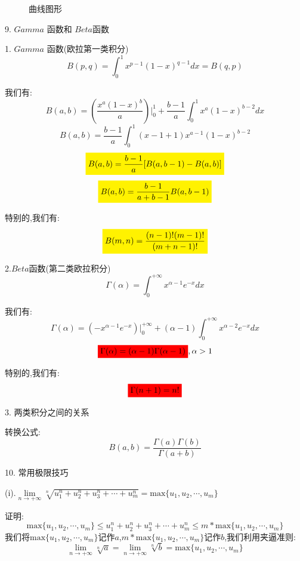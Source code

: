 \begin{figure}[H]
	\caption{曲线图形}
\end{figure}
9. $Gamma$ 函数和 $Beta$函数
\begin{definition}	
	1. $Gamma$ 函数(欧拉第一类积分)
	$$B(p,q)=\int_{0}^{1}x^{p-1}(1-x)^{q-1}dx=B(q,p)$$
	
	我们有:  $$B(a,b)=(\frac{x^a(1-x)^b}{a})|_{0}^{1}+\frac{b-1}{a}\int_{0}^{1}x^{a}(1-x)^{b-2}dx$$
	$$B(a,b)=\frac{b-1}{a}\int_{0}^{1}(x-1+1)x^{a-1}(1-x)^{b-2}$$
	$$\mathcolorbox{yellow}{B(a,b)=\frac{b-1}{a}[B(a,b-1)-B(a,b)]}$$ $$\mathcolorbox{yellow}{B(a,b)=\frac{b-1}{a+b-1}B(a,b-1)}$$
	
	特别的,我们有:  $$\mathcolorbox{yellow}{B(m,n)=\frac{(n-1)!(m-1)!}{(m+n-1)!}}$$
	
	2.$Beta$函数(第二类欧拉积分)
	$$\Gamma(\alpha)=\int_{0}^{+\infty}x^{\alpha-1}e^{-x}dx$$
	
	我们有:  $$\Gamma(\alpha)=(-x^{\alpha-1}e^{-x})|_{0}^{+\infty}+(\alpha-1)\int_{0}^{+\infty}x^{\alpha-2}e^{-x}dx$$
	$$\mathcolorbox{red}{\Gamma(\alpha)=(\alpha-1)\Gamma(\alpha-1)},\alpha>1$$
	
	特别的,我们有:  $$\mathcolorbox{red}{\Gamma(n+1)=n!}$$
	
	3. 两类积分之间的关系
	
	转换公式:  
	$$B(a,b)=\frac{\Gamma(a)\Gamma(b)}{\Gamma(a+b)}$$
	
\end{definition}
10. 常用极限技巧
\begin{theorem}\label{the: 常用极限技巧}
	(i).$\lim\limits_{n\rightarrow +\infty}\sqrt[n]{u_{1}^{n}+u_{2}^{n}+u_{3}^{n}+\cdots+u_{m}^{n}}=\text{max}\{ u_{1},u_{2},\cdots,u_{m}\}$
	
	证明:  $$\text{max}\{ u_{1},u_{2},\cdots,u_{m}\}\leq u_{1}^{n}+u_{2}^{n}+u_{3}^{n}+\cdots+u_{m}^{n}\leq m*\text{max}\{ u_{1},u_{2},\cdots,u_{m}\}$$
	我们将$\text{max}\{ u_{1},u_{2},\cdots,u_{m}\}$记作$a$,$m*\text{max}\{ u_{1},u_{2},\cdots,u_{m}\}$记作$b$,我们利用夹逼准则:  
	$$\lim\limits_{n\rightarrow +\infty}\sqrt[n]{a}=\lim\limits_{n\rightarrow +\infty}\sqrt[n]{b}=\text{max}\{ u_{1},u_{2},\cdots,u_{m}\}$$
\end{theorem}
